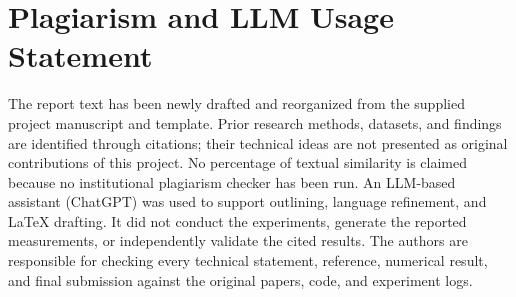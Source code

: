 \documentclass[11pt,a4paper]{article}
\begin{document}


\section{Plagiarism and LLM Usage Statement}

The report text has been newly drafted and reorganized from the supplied project manuscript and template. Prior research methods, datasets, and findings are identified through citations; their technical ideas are not presented as original contributions of this project. No percentage of textual similarity is claimed because no institutional plagiarism checker has been run. An LLM-based assistant (ChatGPT) was used to support outlining, language refinement, and LaTeX drafting. It did not conduct the experiments, generate the reported measurements, or independently validate the cited results. The authors are responsible for checking every technical statement, reference, numerical result, and final submission against the original papers, code, and experiment logs.
\end{document}
